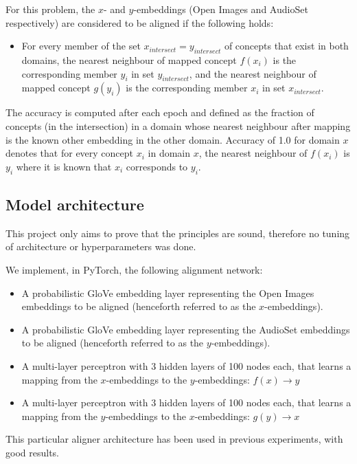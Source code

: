 For this problem, the $x$- and $y$-embeddings (Open Images and AudioSet respectively) are considered to be aligned if the following holds:

\begin{itemize}
    \item For every member of the set $x_{intersect} = y_{intersect}$ of concepts that exist in both domains, the nearest neighbour of mapped concept $f(x_i)$ is the corresponding member $y_i$ in set $y_{intersect}$, and the nearest neighbour of mapped concept $g(y_i)$ is the corresponding member $x_i$ in set $x_{intersect}$. 
\end{itemize}

The accuracy is computed after each epoch and defined as the fraction of concepts (in the intersection) in a domain whose nearest neighbour after mapping is the known other embedding in the other domain. Accuracy of 1.0 for domain $x$ denotes that for every concept $x_i$ in domain $x$, the nearest neighbour of $f(x_i)$ is $y_i$ where it is known that $x_i$ corresponds to $y_i$. 

\subsection{Model architecture}

This project only aims to prove that the principles are sound, therefore no tuning of architecture or hyperparameters was done. 

We implement, in PyTorch, the following alignment network: 

\begin{itemize}
    \item A probabilistic GloVe embedding layer representing the Open Images embeddings to be aligned (henceforth referred to as the $x$-embeddings). 
    \item A probabilistic GloVe embedding layer representing the AudioSet embeddings to be aligned (henceforth referred to as the $y$-embeddings). 
    \item A multi-layer perceptron with 3 hidden layers of 100 nodes each, that learns a mapping from the $x$-embeddings to the $y$-embeddings: $f(x) \rightarrow y$ 
    \item A multi-layer perceptron with 3 hidden layers of 100 nodes each, that learns a mapping from the $y$-embeddings to the $x$-embeddings: $g(y) \rightarrow x$
\end{itemize}

This particular aligner architecture has been used in previous experiments, with good results. 

